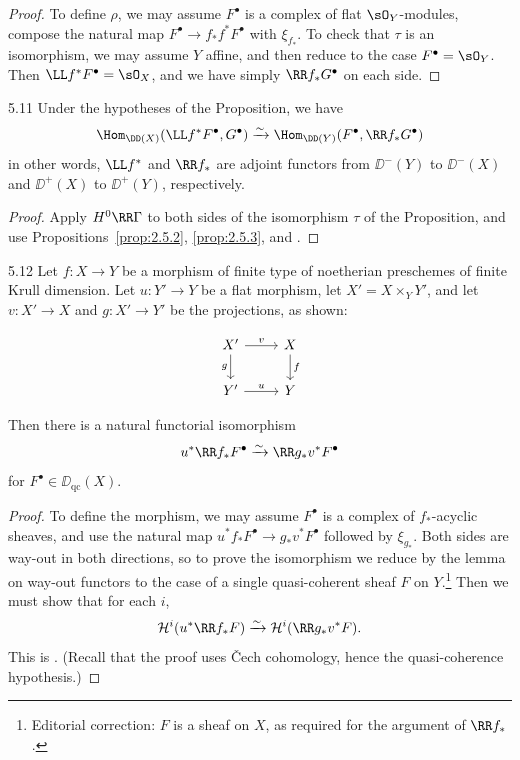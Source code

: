 \begin{proof}
To define $\rho$, we may assume $F^\bullet$ is a complex of flat $\sO_Y$-modules, compose the natural map $F^\bullet\to f_*f^*F^\bullet$ with $\xi_{f_*}$. To check that $\tau$ is an isomorphism, we may assume $Y$ affine, and then reduce to the case $F^\bullet=\sO_Y$. Then $\LL f^*F^\bullet=\sO_X$, and we have simply $\RR f_*G^\bullet$ on each side.
\end{proof}

\begin{bookcorollary}{5.11}\label{cor:2.5.11}
Under the hypotheses of the Proposition, we have
\[
\Hom_{\DD(X)}(\LL f^*F^\bullet,G^\bullet) \xrightarrow{\sim} \Hom_{\DD(Y)}(F^\bullet,\RR f_*G^\bullet)
\]
in other words, $\LL f^*$ and $\RR f_*$ are adjoint functors from $\DD^-(Y)$ to $\DD^-(X)$ and $\DD^+(X)$ to $\DD^+(Y)$, respectively.
\end{bookcorollary}

\begin{proof}
Apply $H^0\RR\Gamma$ to both sides of the isomorphism $\tau$ of the Proposition, and use Propositions~\ref{prop:2.5.2}, \ref{prop:2.5.3}, and .
\end{proof}

\begin{bookproposition}{5.12}\label{prop:2.5.12}
Let $f\colon X\to Y$ be a morphism of finite type of noetherian preschemes of finite Krull dimension. Let $u\colon Y'\to Y$ be a flat morphism, let $X'=X\times_Y Y'$, and let $v\colon X'\to X$ and $g\colon X'\to Y'$ be the projections, as shown:

\[
\begin{tikzcd}
	X' \arrow[r, "v"] \arrow[d, "g"'] & X \arrow[d, "f"] \\
	Y' \arrow[r, "u"] & Y
\end{tikzcd}
\]

Then there is a natural functorial isomorphism
\[
u^* \RR f_*F^\bullet \xrightarrow{\sim} \RR g_* v^*F^\bullet
\]
for $F^\bullet\in\DD_{\mathrm{qc}}(X)$.
\end{bookproposition}

\begin{proof}
To define the morphism, we may assume $F^\bullet$ is a complex of $f_*$-acyclic sheaves, and use the natural map $u^*f_*F^\bullet\to g_*v^*F^\bullet$ followed by $\xi_{g_*}$. Both sides are way-out in both directions, so to prove the isomorphism we reduce by the lemma on way-out functors to the case of a single quasi-coherent sheaf $F$ on $Y$.\footnote{Editorial correction: $F$ is a sheaf on $X$, as required for the argument of $\RR f_*$.} Then we must show that for each $i$,
\[
\mathcal{H}^i(u^*\RR f_*F) \xrightarrow{\sim} \mathcal{H}^i(\RR g_* v^*F).
\]
This is \cite[\nopp III,~1.4.15]{EGA}. (Recall that the proof uses \v{C}ech cohomology, hence the quasi-coherence hypothesis.)
\end{proof}

